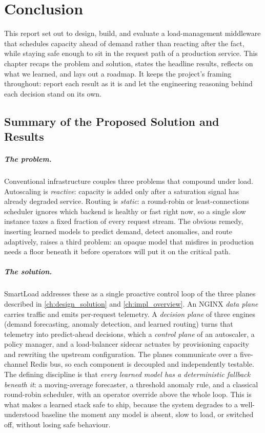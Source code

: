 \chapter{Conclusion}
\label{ch:conclusion}

This report set out to design, build, and evaluate a load-management middleware that
schedules capacity ahead of demand rather than reacting after the fact, while staying
safe enough to sit in the request path of a production service. This chapter recaps the
problem and solution, states the headline results, reflects on what we learned, and lays
out a roadmap. It keeps the project's framing throughout: report each result as it is and
let the engineering reasoning behind each decision stand on its own.

\section{Summary of the Proposed Solution and Results}
\label{conc:summary}

\paragraph{The problem.} Conventional infrastructure couples three problems that
compound under load. Autoscaling is \emph{reactive}: capacity is added only after a
saturation signal has already degraded service. Routing is \emph{static}: a round-robin
or least-connections scheduler ignores which backend is healthy or fast right now, so a
single slow instance taxes a fixed fraction of every request stream. The obvious remedy,
inserting learned models to predict demand, detect anomalies, and route adaptively,
raises a third problem: an opaque model that misfires in production needs a floor
beneath it before operators will put it on the critical path.

\paragraph{The solution.} SmartLoad addresses these as a single proactive control loop
of the three planes described in \cref{ch:design_solution} and \cref{ch:impl_overview}.
An NGINX \emph{data plane} carries traffic and emits per-request telemetry. A
\emph{decision plane} of three engines (demand forecasting, anomaly detection, and
learned routing) turns that telemetry into predict-ahead decisions, which a
\emph{control plane} of an autoscaler, a policy manager, and a load-balancer sidecar
actuates by provisioning capacity and rewriting the upstream configuration. The planes
communicate over a five-channel Redis bus, so each component is decoupled and
independently testable. The defining discipline is that \emph{every learned model has a
deterministic fallback beneath it}: a moving-average forecaster, a threshold anomaly
rule, and a classical round-robin scheduler, with an operator override above the whole
loop. This is what makes a learned stack safe to ship, because the system degrades to a
well-understood baseline the moment any model is absent, slow to load, or switched off,
without losing safe behaviour.

